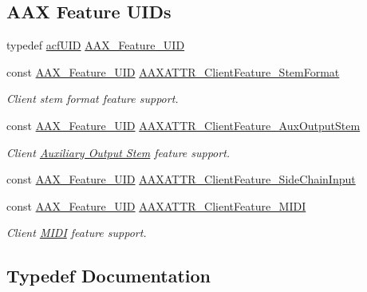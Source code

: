 \subsection*{A\+A\+X Feature U\+I\+Ds}
\begin{DoxyCompactItemize}
\item 
typedef \hyperlink{a00150_ab19414382287ff80930c48a196145214}{acf\+U\+I\+D} \hyperlink{a00299_a53d6cf8a08224b3e813333e411ce798e}{A\+A\+X\+\_\+\+Feature\+\_\+\+U\+I\+D}
\item 
const \hyperlink{a00149_a53d6cf8a08224b3e813333e411ce798e}{A\+A\+X\+\_\+\+Feature\+\_\+\+U\+I\+D} \hyperlink{a00299_a0a8849a8e49eca48475bb88a1da25d5d}{A\+A\+X\+A\+T\+T\+R\+\_\+\+Client\+Feature\+\_\+\+Stem\+Format}
\begin{DoxyCompactList}\small\item\em Client stem format feature support. \end{DoxyCompactList}\item 
const \hyperlink{a00149_a53d6cf8a08224b3e813333e411ce798e}{A\+A\+X\+\_\+\+Feature\+\_\+\+U\+I\+D} \hyperlink{a00299_aa6369eb43ac68152d30ec665de5ea603}{A\+A\+X\+A\+T\+T\+R\+\_\+\+Client\+Feature\+\_\+\+Aux\+Output\+Stem}
\begin{DoxyCompactList}\small\item\em Client \hyperlink{a00339}{Auxiliary Output Stem} feature support. \end{DoxyCompactList}\item 
const \hyperlink{a00149_a53d6cf8a08224b3e813333e411ce798e}{A\+A\+X\+\_\+\+Feature\+\_\+\+U\+I\+D} \hyperlink{a00299_ad130c555cc62e4fbc5c8101d8d10ae45}{A\+A\+X\+A\+T\+T\+R\+\_\+\+Client\+Feature\+\_\+\+Side\+Chain\+Input}
\item 
const \hyperlink{a00149_a53d6cf8a08224b3e813333e411ce798e}{A\+A\+X\+\_\+\+Feature\+\_\+\+U\+I\+D} \hyperlink{a00299_ab018f9c736d0ffd41f1f67e77fa96773}{A\+A\+X\+A\+T\+T\+R\+\_\+\+Client\+Feature\+\_\+\+M\+I\+D\+I}
\begin{DoxyCompactList}\small\item\em Client \hyperlink{a00336}{M\+I\+D\+I} feature support. \end{DoxyCompactList}\end{DoxyCompactItemize}


\subsection{Typedef Documentation}
\hypertarget{a00299_a53d6cf8a08224b3e813333e411ce798e}{}
